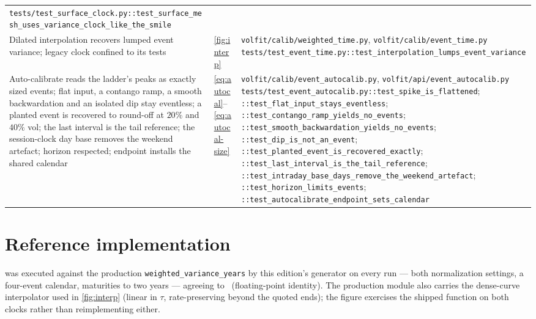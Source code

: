 \documentclass[11pt]{article}
\begin{document}
\begin{longtable}{@{}p{}p{}p{}@{}}
\nolinkurl{tests/test_surface_clock.py::test_surface_mesh_uses_variance_clock_like_the_smile}\\
\addlinespace
Dilated interpolation recovers lumped event variance; legacy clock
confined to its tests &
\cref{fig:interp} &
\nolinkurl{volfit/calib/weighted_time.py},
\nolinkurl{volfit/calib/event_time.py}\newline
\nolinkurl{tests/test_event_time.py::test_interpolation_lumps_event_variance}\\
\addlinespace
Auto-calibrate reads the ladder's peaks as exactly sized events; flat
input, a contango ramp, a smooth backwardation and an isolated dip stay
eventless; a planted event is recovered to round-off at $20\%$ and
$40\%$ vol; the last interval is the tail reference; the session-clock
day base removes the weekend artefact; horizon respected; endpoint
installs the shared calendar &
\eqref{eq:autocal}--\eqref{eq:autocal-size} &
\nolinkurl{volfit/calib/event_autocalib.py},
\nolinkurl{volfit/api/event_autocalib.py}\newline
\nolinkurl{tests/test_event_autocalib.py::test_spike_is_flattened};
\nolinkurl{::test_flat_input_stays_eventless};
\nolinkurl{::test_contango_ramp_yields_no_events};
\nolinkurl{::test_smooth_backwardation_yields_no_events};
\nolinkurl{::test_dip_is_not_an_event};
\nolinkurl{::test_planted_event_is_recovered_exactly};
\nolinkurl{::test_last_interval_is_the_tail_reference};
\nolinkurl{::test_intraday_base_days_remove_the_weekend_artefact};
\nolinkurl{::test_horizon_limits_events};
\nolinkurl{::test_autocalibrate_endpoint_sets_calendar}\\
\bottomrule
\end{longtable}
\endgroup

\section{Reference implementation}
\label{app:ref}

 was executed against the production
\texttt{weighted\_variance\_years} by this edition's generator on every
run --- both normalization settings, a four-event calendar, maturities
to two years --- agreeing to \emcrefagree\ (floating-point identity).
The production module also carries the dense-curve interpolator used in
\cref{fig:interp} (linear in $\tau$, rate-preserving beyond the quoted
ends); the figure exercises the shipped function on both clocks rather
than reimplementing either.
\end{document}
